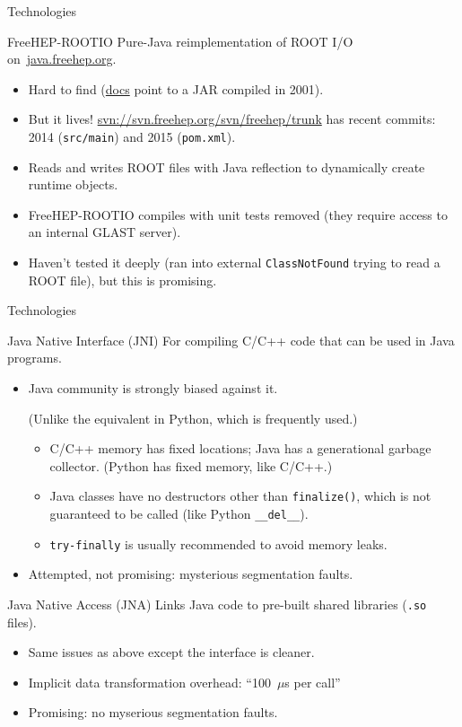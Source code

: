 \documentclass{beamer}
\begin{document}
\begin{frame}{Technologies}

\begin{block}{FreeHEP-ROOTIO}
Pure-Java reimplementation of ROOT I/O \mbox{on \url{java.freehep.org}.\hspace{-1 cm}}
\begin{itemize}
\item Hard to find (\href{http://java.freehep.org/freehep-rootio/}{docs} point to a JAR compiled in 2001).
\item But it lives! {\scriptsize \url{svn://svn.freehep.org/svn/freehep/trunk}} has recent commits: 2014 ({\tt src/main}) and 2015 ({\tt pom.xml}).
\item Reads and writes ROOT files with Java reflection to dynamically create runtime objects.
\item FreeHEP-ROOTIO compiles with unit tests removed (they require access to an internal GLAST server).
\item Haven't tested it deeply (ran into external {\tt ClassNotFound} trying to read a ROOT file), but this is promising.
\end{itemize}
\end{block}
\end{frame}

\begin{frame}{Technologies}
\begin{block}{Java Native Interface (JNI)}
For compiling C/C++ code that can be used in Java programs.
\begin{itemize}
\item Java community is strongly biased against it.

(Unlike the equivalent in Python, which is frequently used.)
\begin{itemize}
\item C/C++ memory has fixed locations; Java has a generational garbage collector. (Python has fixed memory, like C/C++.)
\item Java classes have no destructors other than {\tt finalize()}, which is not guaranteed to be called (like Python {\tt \_\_del\_\_}).
\item {\tt try-finally} is usually recommended to avoid memory leaks.
\end{itemize}
\item Attempted, not promising: mysterious segmentation faults.
\end{itemize}
\end{block}

\begin{block}{Java Native Access (JNA)}
Links Java code to pre-built shared libraries ({\tt .so} files).
\begin{itemize}
\item Same issues as above except the interface is cleaner.
\item Implicit data transformation overhead: ``100~$\mu$s per call''
\item Promising: no myserious segmentation faults.
\end{itemize}
\end{block}
\end{frame}
\end{document}
